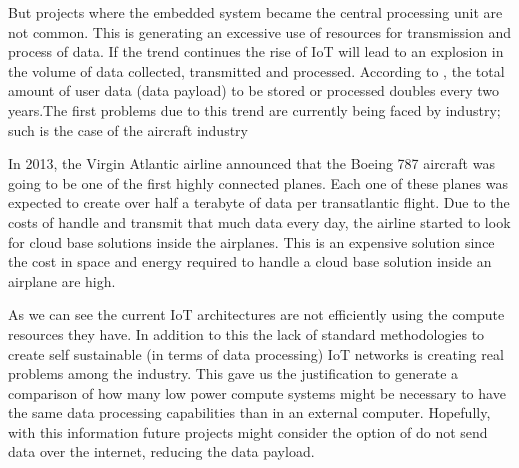 But projects where the embedded system became the central processing unit are
not common. This is generating an excessive use of resources for transmission
and process of data.  If the trend continues the rise of IoT will lead to an
explosion in the volume of data collected, transmitted and processed. According
to \cite{Beraelt}, the total amount of user data (data payload) to be stored or
processed doubles every two years.The first problems due to this trend  are
currently being faced by industry; such is the case of the aircraft industry

In 2013, the Virgin Atlantic \cite{Virgin} airline announced that the Boeing 787
aircraft was going to be one of the first highly connected planes. Each one of
these planes was expected to create over half a terabyte of data per
transatlantic flight.  Due to the costs of handle and transmit that much data
every day, the airline started to look for cloud base solutions inside the
airplanes. This is an expensive solution since the cost in space and energy
required to handle a cloud base solution inside an airplane are high.

As we can see the current IoT architectures are not efficiently using the
compute resources they have. In addition to this the lack of standard
methodologies to create self sustainable (in terms of data processing) IoT
networks is creating real problems among the industry.  This gave us the
justification to generate a comparison of how many low power compute systems
might be necessary to have the same data processing capabilities than in an
external computer. Hopefully, with this information future projects might
consider the option of do not send data over the internet, reducing the data
payload.

\clearpage
